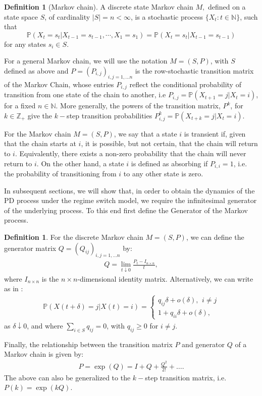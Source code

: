 \documentclass[11pt,reqno]{article}
\theoremstyle{definition}
\newtheorem{definition}[theorem]{Definition}
\begin{document}
\begin{definition}[Markov chain]
	A discrete state Markov chain $M,$ defined on a state space $S$, of cardinality $|S|=n < \infty$, is a stochastic process $\{X_t: t \in \mathbb{N}\}$, such that 
	\begin{equation}
		\mathbb{P} (X_{t} = s_t | X_{t-1} = s_{t-1}, \cdots, X_{1}=s_1) = \mathbb{P} ( X_{t}=s_t  | X_{t-1}=s_{t-1}) 
	\end{equation}
	for any states $s_i\in S$. 
\end{definition}
For a general Markov chain, we will use the notation $M=(S,P)$, with $S$ defined as above and $P=(P_{i,j})_{i,j=1,\dots n}$ is the row-stochastic transition matrix of the Markov Chain, whose entries $P_{i,j}$ reflect the conditional probability of transition from one state of the chain to another, i.e $P_{i,j}=\mathbb{P}(X_{t+1}=j | X_t=i)$, for a fixed $n \in {\mathbb N}$. More generally, the powers of the transition matrix, $P^k$, for $k \in \mathbb{Z}_+$ give the $k-$step transition probabilities $P^k_{i,j}=\mathbb{P}(X_{t+k}=j | X_t=i)$.
\par For the Markov chain $M=(S,P)$, we say that a state $i$ is transient if, given that the chain starts at $i$, it is possible, but not certain, that the chain will return to $i$. Equivalently, there exists a non-zero probability that the chain will never return to $i$. On the other hand, a state $i$ is defined as absorbing if $P_{i,i}=1$, i.e. the probability of transitioning from $i$ to any other state is zero. 
\par In subsequent sections, we will show that, in order to obtain the dynamics of the PD process under the regime switch model, we require the infinitesimal generator of the underlying process. To this end first define the Generator of the Markov process.

\begin{definition}
	For the discrete Markov chain $M=(S,P)$, we can define the generator matrix $Q =(Q_{ij})_{i,j=1,\dots n}$ by: 
	\begin{eqnarray}
		Q = \lim_{t \downarrow 0 } \frac{ P_t - I_{n \times n }}{t},
	\end{eqnarray}
where $I_{n \times n}$ is the $n \times n$-dimensional identity matrix.
Alternatively, we can write as in \cite{zhu2015feynman}:
\begin{eqnarray}
	\mathbb{P}(X(t+\delta)=j | X(t)=i) = \begin{cases}
		q_{ij}\delta + o(\delta), \,\ i \neq j\\
		1 + q_{ii} \delta + o(\delta),
	\end{cases}
\end{eqnarray}
as $\delta \downarrow 0$, and where $\sum_{i \in S} q_{ij}=0$, with $q_{ij} \geq 0$ for $i\neq j$. 
\end{definition}
Finally, the relationship between the transition matrix $P$ and generator $Q$ of a Markov chain is given by: 
 \begin{eqnarray}
 	P = \exp{(Q)} = I + Q + \frac{Q^2}{2!} + \dots .
 \end{eqnarray}
The above can also be generalized to the $k-$step transition matrix, i.e. $P(k) = \exp{(kQ)}$. 
\end{document}
